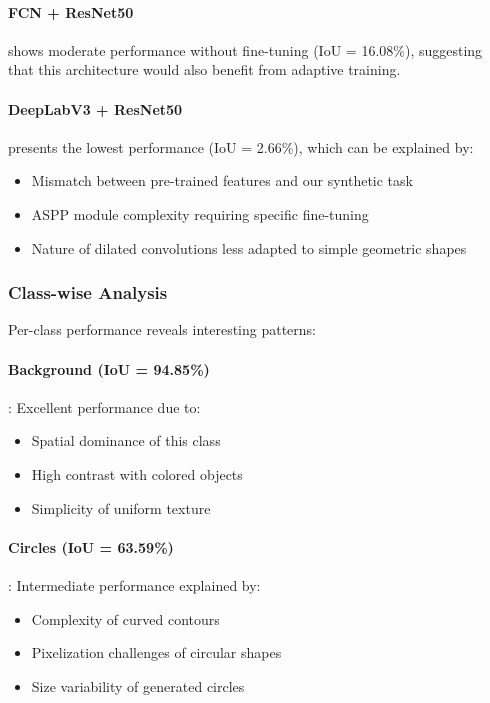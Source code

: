 \documentclass[12pt,a4paper]{article}
\begin{document}
\paragraph{FCN + ResNet50} shows moderate performance without fine-tuning (IoU = 16.08\%), suggesting that this architecture would also benefit from adaptive training.

\paragraph{DeepLabV3 + ResNet50} presents the lowest performance (IoU = 2.66\%), which can be explained by:
\begin{itemize}
    \item Mismatch between pre-trained features and our synthetic task
    \item ASPP module complexity requiring specific fine-tuning
    \item Nature of dilated convolutions less adapted to simple geometric shapes
\end{itemize}

\subsubsection{Class-wise Analysis}

Per-class performance reveals interesting patterns:

\paragraph{Background (IoU = 94.85\%)}: Excellent performance due to:
\begin{itemize}
    \item Spatial dominance of this class
    \item High contrast with colored objects
    \item Simplicity of uniform texture
\end{itemize}

\paragraph{Circles (IoU = 63.59\%)}: Intermediate performance explained by:
\begin{itemize}
    \item Complexity of curved contours
    \item Pixelization challenges of circular shapes
    \item Size variability of generated circles
\end{itemize}
\end{document}
